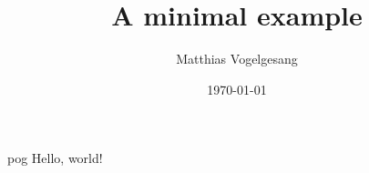 \documentclass[xcolor=dvipsnames]{beamer}
\title{A minimal example}
\date{\today}
\author{Matthias Vogelgesang}
\institute{Centre for Modern Beamer Themes}
\begin{document}
  \begin{frame}
    \titlepage
  \end{frame}

  \begin{frame}{pog}
    Hello, world!
  \end{frame}
\end{document}
